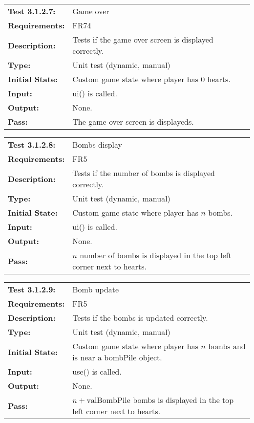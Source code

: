 \documentclass[12pt, titlepage]{article}
\begin{document}
\begin{tabular}{|l|p{10cm}|}
    \hline
    \bf{Test} 3.1.2.7: & Game over \\
    \bf{Requirements}: & FR74 \\
    \bf{Description}: & Tests if the game over screen is displayed correctly. \\
    \bf{Type}: & Unit test (dynamic, manual) \\
    \bf{Initial State}: & Custom game state where player has $0$ hearts. \\
    \bf{Input}: & ui() is called. \\
    \bf{Output}: & None. \\
    \bf{Pass}: & The game over screen is displayeds. \\
    \hline
\end{tabular}

\textcolor{red}{
\begin{tabular}{|l|p{10cm}|}
    \hline
    \bf{Test} 3.1.2.8: & Bombs display \\
    \bf{Requirements}: & FR5 \\
    \bf{Description}: & Tests if the number of bombs is displayed correctly. \\
    \bf{Type}: & Unit test (dynamic, manual) \\
    \bf{Initial State}: & Custom game state where player has $n$ bombs. \\
    \bf{Input}: & ui() is called. \\
    \bf{Output}: & None. \\
    \bf{Pass}: & $n$ number of bombs is displayed in the top left corner next to hearts. \\
    \hline
\end{tabular}
}

\textcolor{red}{
\begin{tabular}{|l|p{10cm}|}
    \hline
    \bf{Test} 3.1.2.9: & Bomb update \\
    \bf{Requirements}: & FR5 \\
    \bf{Description}: & Tests if the bombs is updated correctly. \\
    \bf{Type}: & Unit test (dynamic, manual) \\
    \bf{Initial State}: & Custom game state where player has $n$ bombs and is near a bombPile object. \\
    \bf{Input}: & use() is called. \\
    \bf{Output}: & None. \\
    \bf{Pass}: & $n + \text{valBombPile}$ bombs is displayed in the top left corner next to hearts. \\
    \hline
\end{tabular}
}
\end{document}
